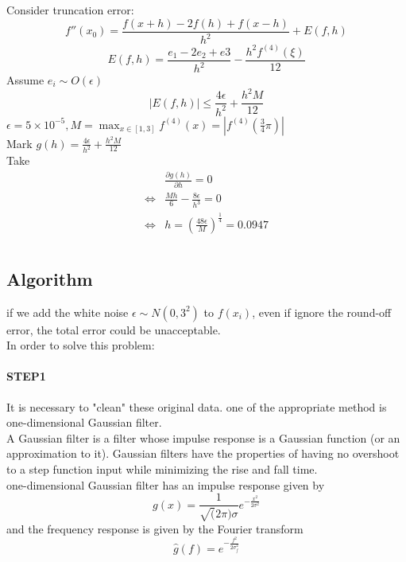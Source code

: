 \documentclass{article}
\begin{document}
\section{}
Consider truncation error:
\begin{equation*}
  f''(x_0)=\frac{f(x+h)-2f(h)+f(x-h)}{h^2}+E(f,h)
\end{equation*}
\begin{equation*}
  E(f,h)=\frac{e_1-2e_2+e3}{h^2}-\frac{h^2f^{(4)}(\xi)}{12}
\end{equation*}
Assume $e_i\sim O(\epsilon)$
\begin{equation*}
  |E(f,h)|\leq\frac{4\epsilon}{h^2}+\frac{h^2M}{12}
\end{equation*}
$\epsilon=5\times10^{-5}, M=\max_{x\in[1,3]}f^{(4)}(x)=|f^{(4)}(\frac34\pi)|$\\
Mark $g(h)=\frac{4\epsilon}{h^2}+\frac{h^2M}{12}$\\
Take \begin{align*}
       &\frac{\partial g(h)}{\partial h}=0  \\
       \Leftrightarrow &\frac{Mh}{6}-\frac{8\epsilon}{h^3}=0\\
       \Leftrightarrow &h=(\frac{48\epsilon}{M})^{\frac{1}{4}}=0.0947
\end{align*}

\section{}

\subsection{Algorithm}
if we add the white noise $\epsilon\sim N(0,3^2)$ to $f(x_i)$, even if ignore the round-off error, the total error could be unacceptable.\\
In order to solve this problem:
\paragraph{STEP1} It is necessary to "clean" these original data. one of the appropriate method is one-dimensional Gaussian filter. \\
A Gaussian filter is a filter whose impulse response is a Gaussian function (or an approximation to it). Gaussian filters have the properties of having no overshoot to a step function input while minimizing the rise and fall time.\\
one-dimensional Gaussian filter has an impulse response given by
\begin{equation*}
  g(x)=\frac{1}{\sqrt(2\pi)\sigma}e ^{-\frac{x^2}{2\sigma ^2}}
\end{equation*}
and the frequency response is given by the Fourier transform
\begin{equation*}
  \hat g(f)=e^ {-\frac{f^2}{2\sigma^2_f}}
\end{equation*}
\end{document}
